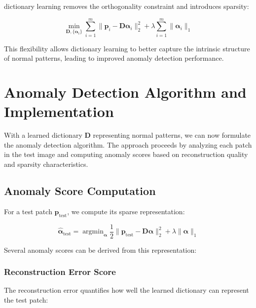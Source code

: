 \documentclass[12pt]{article}
\DeclareMathOperator{\argmin}{argmin}
\newcommand{\dictionary}{\mathbf{D}}
\newcommand{\patch}{\mathbf{p}}
\newcommand{\coeff}{\boldsymbol{\alpha}}
\begin{document}
dictionary learning removes the orthogonality constraint and introduces sparsity:

\begin{equation}
    \label{eq:dict_vs_pca}
    \min_{\dictionary, \{\coeff_i\}} \sum_{i=1}^m \|\patch_i - \dictionary\coeff_i\|_2^2 + \lambda\sum_{i=1}^m\|\coeff_i\|_1
\end{equation}

This flexibility allows dictionary learning to better capture the intrinsic structure of normal patterns, leading to improved anomaly detection performance.

\newpage

\section{Anomaly Detection Algorithm and Implementation}
\label{sec:algorithm}

With a learned dictionary $\dictionary$ representing normal patterns, we can now formulate the anomaly detection algorithm. The approach proceeds by analyzing each patch in the test image and computing anomaly scores based on reconstruction quality and sparsity characteristics.

\subsection{Anomaly Score Computation}
\label{subsec:anomaly_scores}

For a test patch $\patch_{\text{test}}$, we compute its sparse representation:

\begin{equation}
    \label{eq:test_sparse_coding}
    \hat{\coeff}_{\text{test}} = \argmin_{\coeff} \frac{1}{2}\|\patch_{\text{test}} - \dictionary\coeff\|_2^2 + \lambda\|\coeff\|_1
\end{equation}

Several anomaly scores can be derived from this representation:

\subsubsection{Reconstruction Error Score}
\label{subsubsec:reconstruction_score}

The reconstruction error quantifies how well the learned dictionary can represent the test patch:
\end{document}
